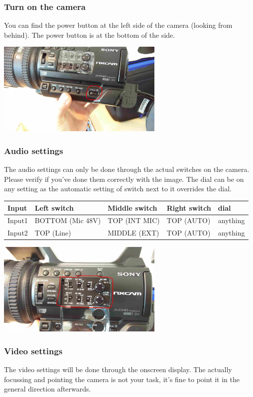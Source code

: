\documentclass{article}
\begin{document}
\subsubsection{Turn on the camera}
You can find the power button at the left side of the camera (looking from behind). The power button is at the bottom of the side.

\includegraphics[width = 80mm]{Sony03.jpg}

\subsubsection{Audio settings}
The audio settings can only be done through the actual switches on the camera. Please verify if you've done them correctly with the image. The dial can be on any setting as the automatic setting of switch next to it overrides the dial.

\begin{tabular}{| l || l | l | l | l |}
Input & Left switch & Middle switch & Right switch & dial \\ \hline
Input1 & BOTTOM (Mic 48V) & TOP (INT MIC) & TOP (AUTO) & anything \\
Input2 & TOP (Line) & MIDDLE (EXT) & TOP (AUTO) & anything \\
\end{tabular}

\includegraphics[width = 80mm]{Sony04.jpg}

\subsubsection{Video settings}
The video settings will be done through the onscreen display. The actually focussing and pointing the camera is not your task, it's fine to point it in the general direction afterwards.
\end{document}
